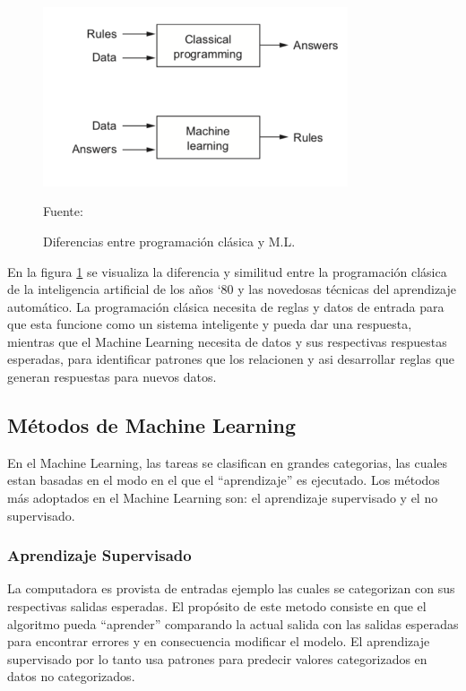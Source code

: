 \begin{figure}[H]
    \begin{center}
        \includegraphics[width=9cm]{img/capitulo_2/machinelearning.png}
        \caption{Diferencias entre programación clásica y M.L.\\}Fuente: \cite{classicprog_and_ml}
        \label{fig:classical_ml}
    \end{center}
\end{figure}

En la figura \ref{fig:classical_ml} se visualiza la diferencia y similitud entre la programación clásica de la inteligencia artificial de los años `80 y las novedosas técnicas del aprendizaje automático. La programación clásica necesita de reglas y datos de entrada para que esta funcione como un sistema inteligente y pueda dar una respuesta, mientras que el Machine Learning necesita de datos y sus respectivas respuestas esperadas, para identificar patrones que los relacionen y asi desarrollar reglas que generan respuestas para nuevos datos.

\subsection{Métodos de Machine Learning}
En el Machine Learning, las tareas se clasifican en grandes categorias, las cuales estan basadas en el modo en el que el ``aprendizaje'' es ejecutado. Los métodos más adoptados en el Machine Learning son: el aprendizaje supervisado y el no supervisado.\\


\subsubsection{Aprendizaje Supervisado}
La computadora es provista de entradas ejemplo las cuales se categorizan con sus respectivas salidas esperadas. El propósito de este metodo consiste en que el algoritmo pueda  ``aprender'' comparando la actual salida con las salidas esperadas para encontrar errores y en consecuencia modificar el modelo. El aprendizaje supervisado por lo tanto usa patrones para predecir valores categorizados en datos no categorizados.\\

